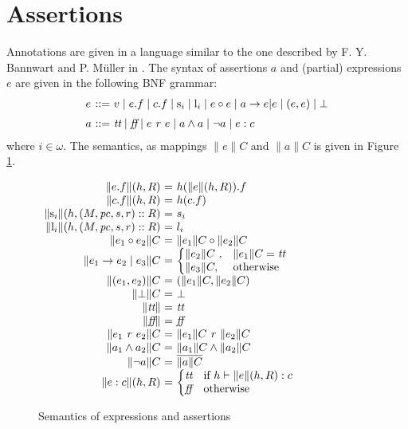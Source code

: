 \documentclass[10pt,twocolumn]{article}
\newcommand{\AND}{\wedge}
\newcommand{\True}{\mbox{\it tt}}
\newcommand{\False}{\mbox{\it  ff}}
\newcommand{\PC}{\mathit{pc}}
\newcommand{\Stack}{\mathrm{s}}
\newcommand{\bmid}{\mid}
\newcommand{\BinOp}{\circ}
\newcommand{\BinRel}{\mathit{r}}
\newcommand{\Sem}[1]{\mbox{$\parallel$}{{#1}}\mbox{$\parallel$}}
\newcommand{\Local}{\mathrm{l}}
\begin{document}
\section{Assertions}
Annotations are given in a language similar to the one described by F. Y. Bannwart and P. M{\"u}ller in \cite{BanMue05}. 
The syntax of assertions $a$ and (partial) expressions $e$ 
are given in the following BNF grammar:
\[
\begin{array}{l@{~::=~}l}
e & v \bmid e.f \bmid c.f \bmid \Stack_i \bmid \Local_i \bmid e \BinOp e \bmid a \rightarrow e | e \bmid(e,e) \bmid \bot \\[2mm]
a & \True \bmid \False \bmid e\ \BinRel\ e \bmid a \AND a \bmid \neg a \bmid e : c
\end{array} \]
where $i\in\omega$. The semantics, as mappings $\Sem{e}C$ and $\Sem{a}C$ is given in Figure \ref{semantics}.
\begin{figure}
$\begin{array}{r@{~=~}l@{}}
\Sem{e.f}(h, R) & h(\Sem{e}(h, R)).f \\
\Sem{c.f}(h, R) & h(c.f) \\
\Sem{\Stack_i}(h, (M,\PC,s,r)::R) & s_i \\
\Sem{\Local_i}(h, (M,\PC,s,r)::R) & l_i \\
\Sem{e_1 \BinOp e_2}C & \Sem{e_1}C \BinOp \Sem{e_2}C \\
\Sem{e_1 \rightarrow e_2 \mid e_3}C & \left\{\begin{array}{@{}ll}
                                      \Sem{e_2}C\ , & \Sem{e_1}C = \True \\
                                      \Sem{e_3}C, & \mbox{otherwise}
                                      \end{array}\right. \\
\Sem{(e_1,e_2)}C & (\Sem{e_1}C,\Sem{e_2}C) \\
\Sem{\bot}C & \bot \\
\Sem{\True} & \True \\
\Sem{\False} & \False \\
\Sem{e_1\ \BinRel\ e_2}C & \Sem{e_1}C\ \BinRel\ \Sem{e_2}C \\
\Sem{a_1\wedge a_2}C & \Sem{a_1}C \wedge \Sem{a_2}C \\
\Sem{\neg a}C & \overline{\Sem{a}C} \\
\Sem{e : c}(h, R) & \left\{\begin{array}{@{}ll} \True & 
                   \mbox{if } h\vdash \Sem{e}(h, R) : c \\
                   \False & \mbox{otherwise} \end{array}\right. \\
\end{array}$
\caption{\label{semantics}Semantics of expressions and assertions}

\end{figure}
\end{document}
